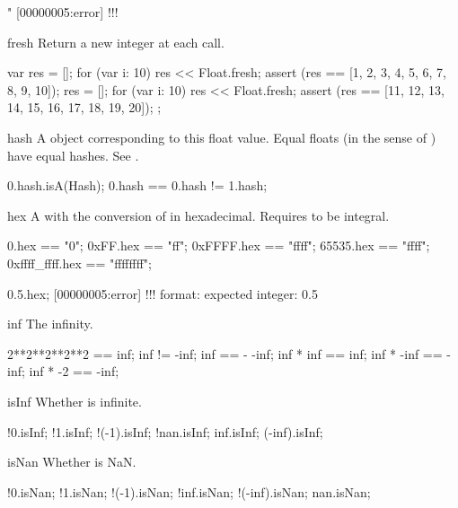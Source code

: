 \begin{urbiscriptapi}
\begin{urbiassert}
"%
[00000005:error] !!! %
\end{urbiassert}


\item[fresh]%
  Return a new integer at each call.
\begin{urbiscript}
{
  var res = [];
  for (var i: 10)
    res << Float.fresh;
  assert (res == [1, 2, 3, 4, 5, 6, 7, 8, 9, 10]);
  res = [];
  for (var i: 10)
    res << Float.fresh;
  assert (res == [11, 12, 13, 14, 15, 16, 17, 18, 19, 20]);
};
\end{urbiscript}


\item[hash] A  object corresponding to this float value.
  Equal floats (in the sense of ) have equal hashes.  See
  .

\begin{urbiassert}
0.hash.isA(Hash);
0.hash == 0.hash != 1.hash;
\end{urbiassert}



\item[hex] A  with the conversion of \this in hexadecimal.
  Requires \this to be integral.
\begin{urbiassert}
          0.hex == "0";
       0xFF.hex == "ff";
     0xFFFF.hex == "ffff";
      65535.hex == "ffff";
0xffff_ffff.hex == "ffffffff";

0.5.hex;
[00000005:error] !!! format: expected integer: 0.5
\end{urbiassert}


\item[inf]
  The infinity.
\begin{urbiassert}
2**2**2**2**2 == inf;
inf != -inf;
inf == - -inf;
inf * inf == inf;
inf * -inf == -inf;
inf * -2 == -inf;
\end{urbiassert}


\item[isInf]%
  Whether \this is infinite.
\begin{urbiassert}
    !0.isInf; !1.isInf; !(-1).isInf;
  !nan.isInf;
   inf.isInf;  (-inf).isInf;
\end{urbiassert}


\item[isNan]%
  Whether is NaN.
\begin{urbiassert}
     !0.isNan; !1.isNan; !(-1).isNan;
   !inf.isNan;  !(-inf).isNan;
    nan.isNan;
\end{urbiassert}



\end{urbiscriptapi}
